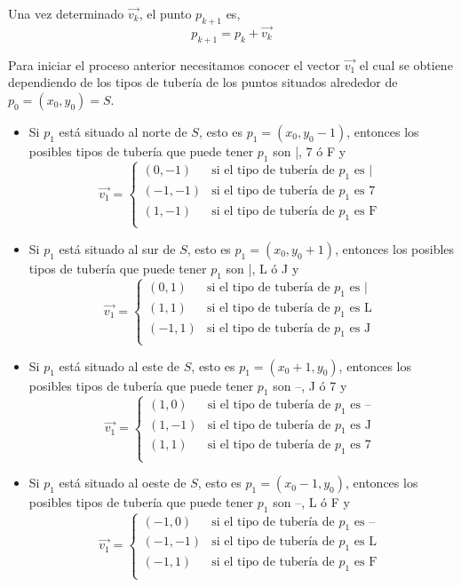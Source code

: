 \documentclass[a4paper,12pt]{article}
\begin{document}
Una vez determinado $\vec{v_k}$, el punto $p_{k+1}$ es,
$$p_{k+1} = p_k + \vec{v_k}$$

Para iniciar el proceso anterior necesitamos conocer el vector $\vec{v_1}$ el cual se obtiene dependiendo de los tipos de tubería de los puntos situados alrededor de $p_0=(x_0,y_0)=S$.

\begin{itemize}
    \item Si $p_1$ está situado al norte de $S$, esto es $p_1=(x_0, y_0-1)$, entonces los posibles tipos de tubería que puede tener $p_1$ son |, 7 ó F y 
    $$\vec{v_1}=\begin{cases}
        (0,-1) & \text{si el tipo de tubería de } p_1\text{ es | } \\
        (-1,-1) & \text{si el tipo de tubería de } p_1\text{ es 7 } \\
        (1,-1) & \text{si el tipo de tubería de } p_1\text{ es F } \\
    \end{cases} $$

    \item Si $p_1$ está situado al sur de $S$, esto es $p_1=(x_0, y_0+1)$, entonces los posibles tipos de tubería que puede tener $p_1$ son |, L ó J y 
    $$\vec{v_1}=\begin{cases}
        (0, 1) & \text{si el tipo de tubería de } p_1\text{ es | } \\
        (1, 1) & \text{si el tipo de tubería de } p_1\text{ es L } \\
        (-1,1) & \text{si el tipo de tubería de } p_1\text{ es J } \\
    \end{cases} $$
    
    \item Si $p_1$ está situado al este de $S$, esto es $p_1=(x_0+1, y_0)$, entonces los posibles tipos de tubería que puede tener $p_1$ son --, J ó 7 y 
    $$\vec{v_1}=\begin{cases}
        (1, 0) & \text{si el tipo de tubería de } p_1\text{ es -- } \\
        (1, -1) & \text{si el tipo de tubería de } p_1\text{ es J } \\
        (1, 1) & \text{si el tipo de tubería de } p_1\text{ es 7 } \\
    \end{cases} $$
    
    \item Si $p_1$ está situado al oeste de $S$, esto es $p_1=(x_0-1, y_0)$, entonces los posibles tipos de tubería que puede tener $p_1$ son --, L ó F y 
    $$\vec{v_1}=\begin{cases}
        (-1, 0) & \text{si el tipo de tubería de } p_1\text{ es -- } \\
        (-1, -1) & \text{si el tipo de tubería de } p_1\text{ es L } \\
        (-1, 1) & \text{si el tipo de tubería de } p_1\text{ es F } \\
    \end{cases} $$    
\end{itemize}
\end{document}
